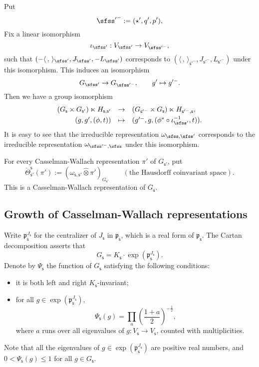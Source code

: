 \documentclass[12pt,a4paper]{amsart}
\newcommand{\p}{\mathfrak p}
\newcommand{\la}{\langle}
\newcommand{\ra}{\rangle}
\newcommand{\be}{\begin {equation}}
\newcommand{\ee}{\end {equation}}
\numberwithin{equation}{section}
\theoremstyle{remark}
\begin{document}
Put
\[%
   {\sfss'}^-:=(\star', q', p'),
\]
Fix a linear isomorphism
\be\label{iota0}
 \iota_{\sfss'}:  V_{\sfss'}\rightarrow V_{\sfss'^-}, %
\ee
such that $(-\la\,,\,\ra_{\sfss'}, J_{\sfss'},-L_{\sfss'})$ corresponds to   $(\la\,,\,\ra_{\mathsf s'^-}, J_{\mathsf s'^-}, L_{\mathsf s'^-})$ under this isomorphism.
This induces an isomorphism
\be\label{isoggp}
  G_{\sfss'}\rightarrow G_{\sfss'^-}, \qquad g'\mapsto g'^-.
\ee
Then we have a group isomorphism
\be\label{identifyjg}
\begin{array}{rcl}
  (G_{\mathsf s}\times G_{\mathsf s'})\ltimes H_{\mathsf s, \mathsf s'}&\rightarrow& (G_{\mathsf s'^-}\times G_{\mathsf s})\ltimes H_{\mathsf s'^-, \mathsf s},\smallskip\\
   (g, g', (\phi, t))&\mapsto & (g'^-, g, (\phi^*  \circ \iota_{\sfss'}^{-1}, t)).
   \end{array}
\ee
It is easy to see that the irreducible representation $\omega_{\sfss, \sfss'}$ corresponds to the irreducible representation $\omega_{\sfss'^-, \sfss}$ under this isomorphism.


 For every Casselman-Wallach representation $\pi'$ of $G_{\mathsf s'}$,
put
\[
   \check \Theta_{\mathsf s'}^{\mathsf s}(\pi'):=(\omega_{\mathsf s, \mathsf s'}\widehat \otimes \pi')_{G_{\mathsf s'}} \qquad (\textrm{the  Hausdorff coinvariant space}).
\]
This is a Casselman-Wallach representation of $G_{\mathsf s}$.



\subsection{Growth of Casselman-Wallach representations}

Write $\p_\mathsf s^{J_\mathsf s}$ for the centralizer of $J_\mathsf s$ in $\p_\mathsf s$, which is a real form of $\p_\mathsf s$. The Cartan decomposition asserts that
\[
  G_\mathsf s=K_\mathsf s\cdot \exp(\p_\mathsf s^{J_\mathsf s}).
\]
Denote by  $\Psi_\mathsf s$ the function of $G_\mathsf s$ satisfying the following conditions:
\begin{itemize}
\item it is both left and right $K_\mathsf s$-invariant;
\item for all $g\in \exp(\p_\mathsf s^{J_\mathsf s})$,
\[
  \Psi_\mathsf s(g)=\prod_{a} \left(\frac{1+a}{2}\right)^{-\frac{1}{2}},
\]
 where $a$ runs over all eigenvalues of $g: V_\mathsf s\rightarrow V_\mathsf s$, counted with multiplicities.
\end{itemize}
Note that all the  eigenvalues of $g \in \exp(\p_\mathsf s^{J_\mathsf s})$ are positive real numbers, and  $0<\Psi_\mathsf s(g)\leq 1$ for all $g\in G_\mathsf s$.
\end{document}
